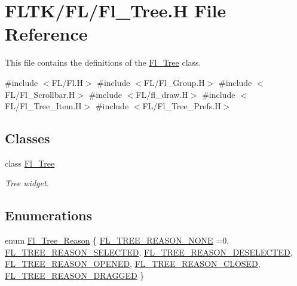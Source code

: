 \hypertarget{_fl___tree_8_h}{}\section{F\+L\+T\+K/\+F\+L/\+Fl\+\_\+\+Tree.H File Reference}
\label{_fl___tree_8_h}


This file contains the definitions of the \hyperlink{class_fl___tree}{Fl\+\_\+\+Tree} class.  


{\ttfamily \#include $<$F\+L/\+Fl.\+H$>$}\newline
{\ttfamily \#include $<$F\+L/\+Fl\+\_\+\+Group.\+H$>$}\newline
{\ttfamily \#include $<$F\+L/\+Fl\+\_\+\+Scrollbar.\+H$>$}\newline
{\ttfamily \#include $<$F\+L/fl\+\_\+draw.\+H$>$}\newline
{\ttfamily \#include $<$F\+L/\+Fl\+\_\+\+Tree\+\_\+\+Item.\+H$>$}\newline
{\ttfamily \#include $<$F\+L/\+Fl\+\_\+\+Tree\+\_\+\+Prefs.\+H$>$}\newline
\subsection*{Classes}
\begin{DoxyCompactItemize}
\item 
class \hyperlink{class_fl___tree}{Fl\+\_\+\+Tree}
\begin{DoxyCompactList}\small\item\em Tree widget. \end{DoxyCompactList}\end{DoxyCompactItemize}
\subsection*{Enumerations}
\begin{DoxyCompactItemize}
\item 
enum \hyperlink{_fl___tree_8_h_a006d7648bd2fdf6cfcb877eb592a1bf3}{Fl\+\_\+\+Tree\+\_\+\+Reason} \{ \newline
\hyperlink{_fl___tree_8_h_a006d7648bd2fdf6cfcb877eb592a1bf3a44780aaff204d81aed501acd2022160c}{F\+L\+\_\+\+T\+R\+E\+E\+\_\+\+R\+E\+A\+S\+O\+N\+\_\+\+N\+O\+NE} =0, 
\hyperlink{_fl___tree_8_h_a006d7648bd2fdf6cfcb877eb592a1bf3aef915733618ed814b5495823fc314ba0}{F\+L\+\_\+\+T\+R\+E\+E\+\_\+\+R\+E\+A\+S\+O\+N\+\_\+\+S\+E\+L\+E\+C\+T\+ED}, 
\hyperlink{_fl___tree_8_h_a006d7648bd2fdf6cfcb877eb592a1bf3afc521740d2cc46fbd6072ec664a97aa9}{F\+L\+\_\+\+T\+R\+E\+E\+\_\+\+R\+E\+A\+S\+O\+N\+\_\+\+D\+E\+S\+E\+L\+E\+C\+T\+ED}, 
\hyperlink{_fl___tree_8_h_a006d7648bd2fdf6cfcb877eb592a1bf3ad592e50c4e96dc28a122a2622a3feece}{F\+L\+\_\+\+T\+R\+E\+E\+\_\+\+R\+E\+A\+S\+O\+N\+\_\+\+O\+P\+E\+N\+ED}, 
\newline
\hyperlink{_fl___tree_8_h_a006d7648bd2fdf6cfcb877eb592a1bf3a301a2a813fb688390fc624cb21ef629d}{F\+L\+\_\+\+T\+R\+E\+E\+\_\+\+R\+E\+A\+S\+O\+N\+\_\+\+C\+L\+O\+S\+ED}, 
\hyperlink{_fl___tree_8_h_a006d7648bd2fdf6cfcb877eb592a1bf3afa985a52391b74bfda7e6bdbdfddc6d6}{F\+L\+\_\+\+T\+R\+E\+E\+\_\+\+R\+E\+A\+S\+O\+N\+\_\+\+D\+R\+A\+G\+G\+ED}
 \}
\end{DoxyCompactItemize}


